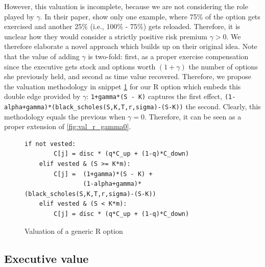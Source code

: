  

However, this valuation is incomplete, because we are not considering the role played by $\gamma$. In their paper, \cite{huang2013dynamic} show only one example, where 75\% of the option gets exercised and another 25\% (i.e., 100\% - 75\%) gets reloaded. Therefore, it is unclear how they would consider a strictly positive risk premium $\gamma > 0$. 
We therefore elaborate a novel approach which builds up on their original idea. Note that the value of adding $\gamma$ is two-fold: first, as a proper exercise compensation since the executive gets stock and options worth $(1+\gamma)$ the number of options she previously held, and second as time value recovered. Therefore, we propose the valuation methodology in snippet \ref*{fig:val_r} for our R option which embeds this double edge provided by $\gamma$: \verb|1+gamma*(S - K)| captures the first effect, \verb|(1-alpha+gamma)*(black_scholes(S,K,T,r,sigma)-(S-K))| the second.
Clearly, this methodology equals the previous when $\gamma = 0$. Therefore, it can be seen as a proper extension of \ref*{fig:val_r_gamma0}.

\begin{figure}
    \begin{lstlisting}[breaklines, basicstyle=\ttfamily\small] 
    if not vested:                         
        C[j] = disc * (q*C_up + (1-q)*C_down)
    elif vested & (S >= K*m):                
        C[j] =  (1+gamma)*(S - K) + 
                (1-alpha+gamma)*(black_scholes(S,K,T,r,sigma)-(S-K))
    elif vested & (S < K*m):  
        C[j] = disc * (q*C_up + (1-q)*C_down)
    \end{lstlisting}
    \caption{Valuation of a generic R option}
    \label{fig:val_r}
\end{figure}



\subsection{Executive value}



